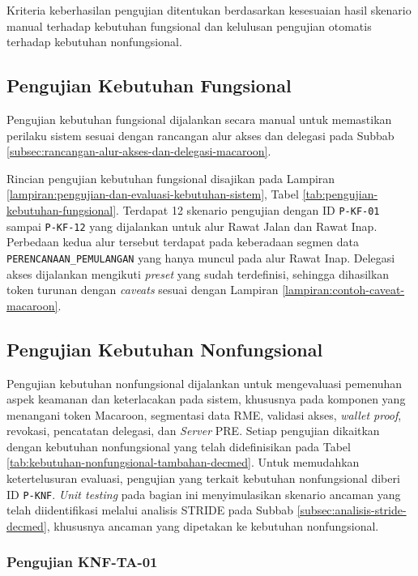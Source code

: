 \documentclass[bahasa, 12pt, a4paper, onecolumn, oneside, final]{report}
\begin{document}
Kriteria keberhasilan pengujian ditentukan berdasarkan kesesuaian hasil skenario manual terhadap kebutuhan fungsional dan kelulusan pengujian otomatis terhadap kebutuhan nonfungsional.
\subsection{Pengujian Kebutuhan Fungsional}
\label{subsec:pengujian-kebutuhan-fungsional}

Pengujian kebutuhan fungsional dijalankan secara manual untuk memastikan perilaku sistem sesuai dengan rancangan alur akses dan delegasi pada Subbab \ref{subsec:rancangan-alur-akses-dan-delegasi-macaroon}.

Rincian pengujian kebutuhan fungsional disajikan pada Lampiran \ref{lampiran:pengujian-dan-evaluasi-kebutuhan-sistem}, Tabel \ref{tab:pengujian-kebutuhan-fungsional}. Terdapat 12 skenario pengujian dengan ID \texttt{P-KF-01} sampai \texttt{P-KF-12} yang dijalankan untuk alur Rawat Jalan dan Rawat Inap. Perbedaan kedua alur tersebut terdapat pada keberadaan segmen data \texttt{PERENCANAAN\_PEMULANGAN} yang hanya muncul pada alur Rawat Inap. Delegasi akses dijalankan mengikuti \textit{preset} yang sudah terdefinisi, sehingga dihasilkan token turunan dengan \textit{caveats} sesuai dengan Lampiran \ref{lampiran:contoh-caveat-macaroon}. \subsection{Pengujian Kebutuhan Nonfungsional}
\label{subsec:pengujian-kebutuhan-nonfungsional}

Pengujian kebutuhan nonfungsional dijalankan untuk mengevaluasi pemenuhan aspek keamanan dan keterlacakan pada sistem, khususnya pada komponen yang menangani token Macaroon, segmentasi data RME, validasi akses, \textit{wallet proof}, revokasi, pencatatan delegasi, dan \textit{Server} PRE. Setiap pengujian dikaitkan dengan kebutuhan nonfungsional yang telah didefinisikan pada Tabel \ref{tab:kebutuhan-nonfungsional-tambahan-decmed}. Untuk memudahkan ketertelusuran evaluasi, pengujian yang terkait kebutuhan nonfungsional diberi ID \texttt{P-KNF}. \textit{Unit testing} pada bagian ini menyimulasikan skenario ancaman yang telah diidentifikasi melalui analisis STRIDE pada Subbab \ref{subsec:analisis-stride-decmed}, khususnya ancaman yang dipetakan ke kebutuhan nonfungsional.

\subsubsection{Pengujian KNF-TA-01}
\label{subsubsec:pengujian-knf-ta-01}
\end{document}
